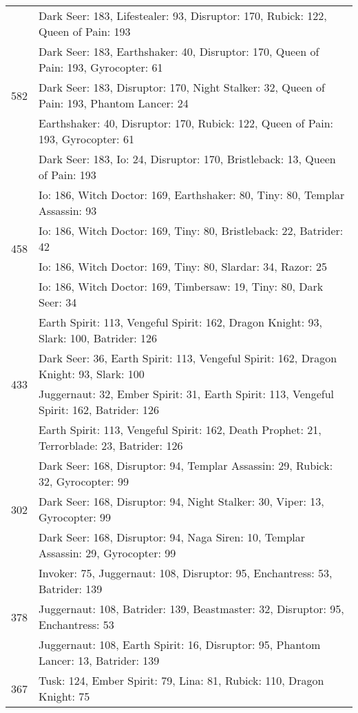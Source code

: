\documentclass[result.tex]{subfiles}
\begin{document}
\begin{table}[H]
\begin{tabular}{ | c | p{12.5cm} | }
\hline
\multirow{5}{*}{582}
& Dark Seer: 183, Lifestealer: 93, Disruptor: 170, Rubick: 122, Queen of Pain: 193 \\
& Dark Seer: 183, Earthshaker: 40, Disruptor: 170, Queen of Pain: 193, Gyrocopter: 61 \\
& Dark Seer: 183, Disruptor: 170, Night Stalker: 32, Queen of Pain: 193, Phantom Lancer: 24 \\
& Earthshaker: 40, Disruptor: 170, Rubick: 122, Queen of Pain: 193, Gyrocopter: 61 \\
& Dark Seer: 183, Io: 24, Disruptor: 170, Bristleback: 13, Queen of Pain: 193 \\
\hline
\multirow{4}{*}{458}
& Io: 186, Witch Doctor: 169, Earthshaker: 80, Tiny: 80, Templar Assassin: 93 \\
& Io: 186, Witch Doctor: 169, Tiny: 80, Bristleback: 22, Batrider: 42 \\
& Io: 186, Witch Doctor: 169, Tiny: 80, Slardar: 34, Razor: 25 \\
& Io: 186, Witch Doctor: 169, Timbersaw: 19, Tiny: 80, Dark Seer: 34 \\
\hline
\multirow{4}{*}{433}
& Earth Spirit: 113, Vengeful Spirit: 162, Dragon Knight: 93, Slark: 100, Batrider: 126 \\
& Dark Seer: 36, Earth Spirit: 113, Vengeful Spirit: 162, Dragon Knight: 93, Slark: 100 \\
& Juggernaut: 32, Ember Spirit: 31, Earth Spirit: 113, Vengeful Spirit: 162, Batrider: 126 \\
& Earth Spirit: 113, Vengeful Spirit: 162, Death Prophet: 21, Terrorblade: 23, Batrider: 126 \\
\hline
\multirow{3}{*}{302}
& Dark Seer: 168, Disruptor: 94, Templar Assassin: 29, Rubick: 32, Gyrocopter: 99 \\
& Dark Seer: 168, Disruptor: 94, Night Stalker: 30, Viper: 13, Gyrocopter: 99 \\
& Dark Seer: 168, Disruptor: 94, Naga Siren: 10, Templar Assassin: 29, Gyrocopter: 99 \\
\hline
\multirow{3}{*}{378}
& Invoker: 75, Juggernaut: 108, Disruptor: 95, Enchantress: 53, Batrider: 139 \\
& Juggernaut: 108, Batrider: 139, Beastmaster: 32, Disruptor: 95, Enchantress: 53 \\
& Juggernaut: 108, Earth Spirit: 16, Disruptor: 95, Phantom Lancer: 13, Batrider: 139 \\
\hline
\multirow{3}{*}{367}
& Tusk: 124, Ember Spirit: 79, Lina: 81, Rubick: 110, Dragon Knight: 75 \\

\end{tabular}
\end{table}
\end{document}
